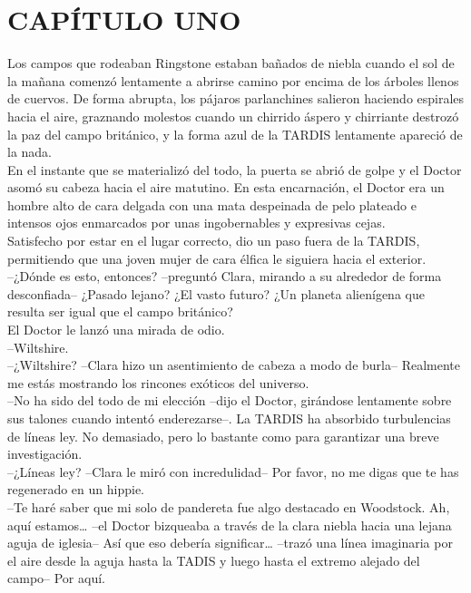 \chapter*{CAPÍTULO UNO}
Los campos que rodeaban Ringstone estaban bañados de niebla cuando el
sol de la mañana comenzó lentamente a abrirse camino por encima de los
árboles llenos de cuervos. De forma abrupta, los pájaros parlanchines
salieron haciendo espirales hacia el aire, graznando molestos cuando un
chirrido áspero y chirriante destrozó la paz del campo británico, y la
forma azul de la TARDIS lentamente apareció de la nada.\\
En el instante que se materializó del todo, la puerta se abrió de golpe
y el Doctor asomó su cabeza hacia el aire matutino. En esta encarnación,
el Doctor era un hombre alto de cara delgada con una mata despeinada de
pelo plateado e intensos ojos enmarcados por unas ingobernables y
expresivas cejas.\\
Satisfecho por estar en el lugar correcto, dio un paso fuera de la
TARDIS, permitiendo que una joven mujer de cara élfica le siguiera hacia
el exterior.\\
--¿Dónde es esto, entonces? --preguntó Clara, mirando a su alrededor de
forma desconfiada-- ¿Pasado lejano? ¿El vasto futuro? ¿Un planeta
alienígena que resulta ser igual que el campo británico?\\
El Doctor le lanzó una mirada de odio.\\
--Wiltshire.\\
--¿Wiltshire? --Clara hizo un asentimiento de cabeza a modo de burla--
Realmente me estás mostrando los rincones exóticos del universo.\\
--No ha sido del todo de mi elección --dijo el Doctor, girándose
lentamente sobre sus talones cuando intentó enderezarse--. La TARDIS ha
absorbido turbulencias de líneas ley. No demasiado, pero lo bastante
como para garantizar una breve investigación.\\
--¿Líneas ley? --Clara le miró con incredulidad-- Por favor, no me digas
que te has regenerado en un hippie.\\
--Te haré saber que mi solo de pandereta fue algo destacado en
Woodstock. Ah, aquí estamos\ldots{} --el Doctor bizqueaba a través de la
clara niebla hacia una lejana aguja de iglesia-- Así que eso debería
significar\ldots{} --trazó una línea imaginaria por el aire desde la
aguja hasta la TADIS y luego hasta el extremo alejado del campo-- Por
aquí.\\
